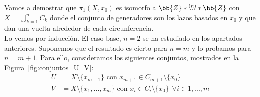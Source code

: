 \begin{ejemplo}
\begin{enumerate}
        Vamos a demostrar que $\pi_1(X,x_0)$ es isomorfo a $\bb{Z} \ast \overset{(n)}{...}\ast \bb{Z}$ con $X=\bigcup\limits_{k=1}^n C_k$ donde el conjunto de generadores son los lazos basados en $x_0$ y que dan una vuelta alrededor de cada circunferencia.\\

        Lo vemos por inducción. El caso base, $n=2$ se ha estudiado en los apartados anteriores. Suponemos que el resultado es cierto para $n=m$ y lo probamos para $n=m+1$. Para ello, consideramos los siguientes conjuntos, mostrados en la Figura~\ref{fig:conjuntos_U_V}:
        \begin{align*}
            U&=X\setminus\{x_{m+1}\} \text{ con } x_{m+1}\in C_{m+1}\setminus \{x_0\}\\
            V &= X \setminus \{x_1,...,x_m\} \text{ con } x_i\in C_i\setminus\{x_0\}\ \ \forall i \in 1,...,m
        \end{align*}

        \begin{figure}[ht]
            \centering
\end{figure}
\end{enumerate}
\end{ejemplo}
